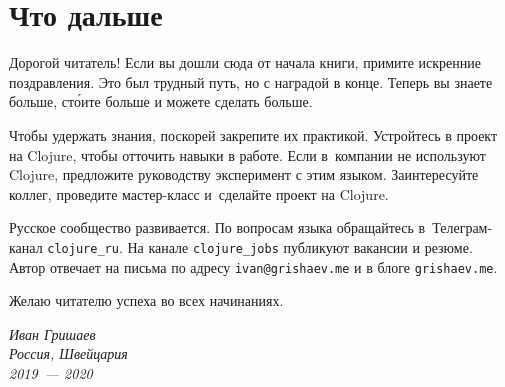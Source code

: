 \chapter{Что дальше}

Дорогой читатель! Если вы дошли сюда от начала книги, примите искренние
поздравления. Это был трудный путь, но с наградой в конце. Теперь вы знаете
больше, ст\'{о}ите больше и можете сделать больше.

Чтобы удержать знания, поскорей закрепите их практикой. Устройтесь в проект на
Clojure, чтобы отточить навыки в работе. Если в~компании не используют Clojure,
предложите руководству эксперимент с этим языком. Заинтересуйте коллег,
проведите мастер-класс и~сделайте проект на Clojure.

Русское сообщество развивается. По вопросам языка обращайтесь в~Телеграм-канал
\verb|clojure_ru|. На канале \verb|clojure_jobs| публикуют вакансии и
резюме. Автор отвечает на письма по адресу \verb|ivan@grishaev.me| и в блоге
\verb|grishaev.me|.

Желаю читателю успеха во всех начинаниях.

\vspace{1em}

\noindent
\textit{Иван Гришаев\\Россия, Швейцария\\2019~--- 2020}
